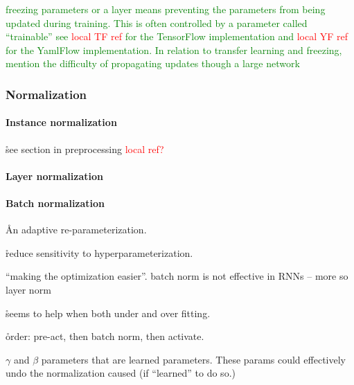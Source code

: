 \textcolor{green}{{freezing} parameters or a layer means preventing the parameters from being updated during training. This is often controlled by a parameter called ``trainable'' see \textcolor{red}{local TF ref} for the TensorFlow implementation and \textcolor{red}{local YF ref} for the YamlFlow implementation. In relation to transfer learning and freezing, mention the difficulty of propagating updates though a large network}

\subsubsection{Normalization}



\paragraph{Instance normalization}

\r{see section in preprocessing \textcolor{red}{local ref?}}

\paragraph{Layer normalization}

\paragraph{Batch normalization}


\r{An adaptive re-parameterization.}

\r{reduce sensitivity to hyperparameterization.}


\r{``making the optimization easier''. batch norm is not effective in RNNs -- more so layer norm}

\r{seems to help when both under and over fitting.}

\r{order: pre-act, then batch norm, then activate.}

\r{$\gamma$ and $\beta$ parameters that are learned parameters. These params could effectively undo the normalization caused (if ``learned'' to do so.)}


